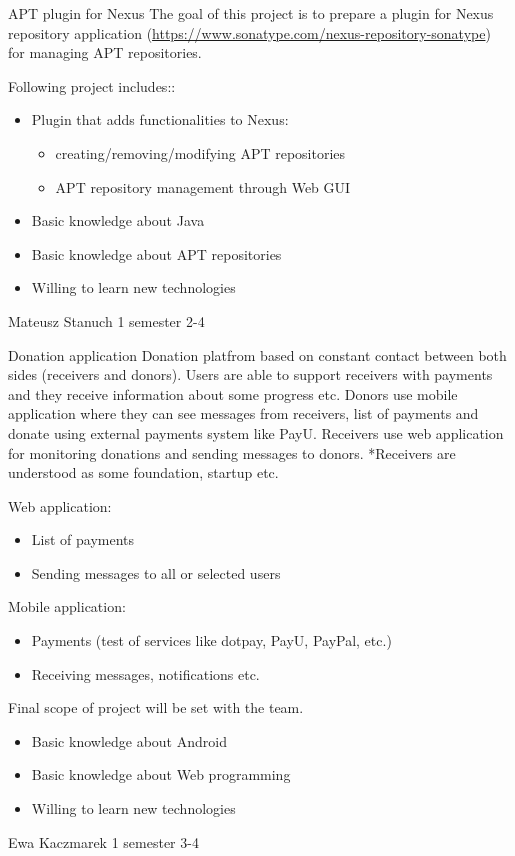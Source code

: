 \begin{project}
{APT plugin for Nexus}
{The goal of this project is to prepare a plugin for Nexus repository application (\url{https://www.sonatype.com/nexus-repository-sonatype}) for managing APT repositories.}
{
Following project includes::
\begin{itemize}
	\item Plugin that adds functionalities to Nexus:
		\begin{itemize}
			\item creating/removing/modifying APT repositories
			\item APT repository management through Web GUI
		\end{itemize}
\end{itemize}
}
{
\begin{itemize}
	\item Basic knowledge about Java
	\item Basic knowledge about APT repositories
	\item Willing to learn new technologies
\end{itemize}
}
{Mateusz Stanuch}
{1 semester}
{2-4}
\end{project}
\begin{project}
{Donation application}
{
Donation platfrom based on constant contact between both sides (receivers and donors). Users are able to support receivers with payments and they receive information about some progress etc. Donors use mobile application where they can see messages from receivers, list of payments and donate using external payments system like PayU. Receivers use web application for monitoring donations and sending messages to donors.
 \bigbreak
*Receivers are understood as some foundation, startup etc.
} 
{
Web application:
\begin{itemize}
	\item List of payments
	\item Sending messages to all or selected users
\end{itemize}
\bigbreak
Mobile application:
\begin{itemize}
	\item Payments (test of services like dotpay, PayU, PayPal, etc.)
	\item Receiving messages, notifications etc.
\end{itemize}
Final scope of project will be set with the team.
}
{
\begin{itemize}
	\item Basic knowledge about Android
	\item Basic knowledge about Web programming
	\item Willing to learn new technologies
\end{itemize}
}
{Ewa Kaczmarek}
{1 semester}
{3-4}
\end{project}
